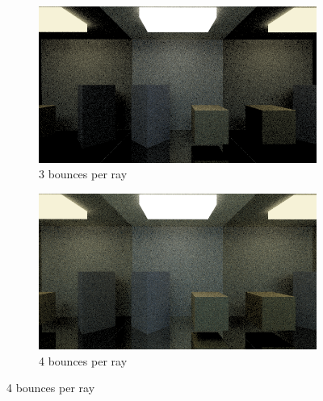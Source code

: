 \documentclass[titlepage,12pt]{report}
\begin{document}
\begin{figure}[H]
	\medskip
	\begin{subfigure}{.48\textwidth}
		\centering
		\includegraphics[scale=0.315]{media/mirrors_rect/cornell_mirrors_3.png}	
		\caption{3 bounces per ray}
		\label{mr_rect_3}
	\end{subfigure}		
	\begin{subfigure}{.48\textwidth}
		\centering
		\includegraphics[scale=0.315]{media/mirrors_rect/cornell_mirrors_4.png}
		\caption{4 bounces per ray}
		\label{mr_rect_4}
	\end{subfigure}
	

\end{figure}
\end{document}

